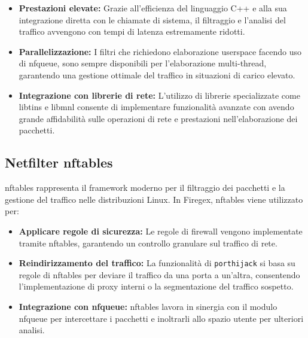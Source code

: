 \begin{itemize}
    \item \textbf{Prestazioni elevate:} Grazie all'efficienza del linguaggio C++ e alla sua integrazione diretta con le chiamate di sistema, il filtraggio e
    l'analisi del traffico avvengono con tempi di latenza estremamente ridotti.
    \item \textbf{Parallelizzazione:} I filtri che richiedono elaborazione userspace facendo uso di nfqueue, sono sempre disponibili per l'elaborazione multi-thread,
    garantendo una gestione ottimale del traffico in situazioni di carico elevato.
    \item \textbf{Integrazione con librerie di rete:} L'utilizzo di librerie specializzate come libtins e libmnl consente di implementare funzionalità avanzate
    con avendo grande affidabilità sulle operazioni di rete e prestazioni nell'elaborazione dei pacchetti.
\end{itemize}

\subsection{Netfilter nftables}
nftables rappresenta il framework moderno per il filtraggio dei pacchetti e la gestione del traffico nelle distribuzioni Linux. In Firegex, nftables viene utilizzato per:
\begin{itemize}
    \item \textbf{Applicare regole di sicurezza:} Le regole di firewall vengono implementate tramite nftables, garantendo un controllo granulare sul traffico di rete.
    \item \textbf{Reindirizzamento del traffico:} La funzionalità di \texttt{porthijack} si basa su regole di nftables per deviare il traffico da una porta
    a un’altra, consentendo l’implementazione di proxy interni o la segmentazione del traffico sospetto.
    \item \textbf{Integrazione con nfqueue:} nftables lavora in sinergia con il modulo nfqueue per intercettare i pacchetti e inoltrarli allo spazio
    utente per ulteriori analisi.
\end{itemize}

